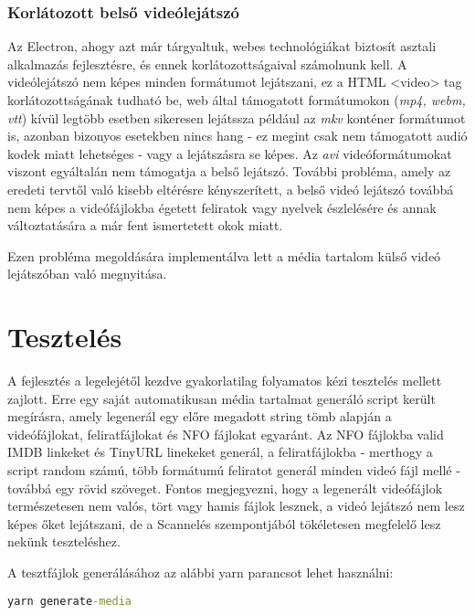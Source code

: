 \subsubsection{Korlátozott belső videólejátszó}
Az Electron, ahogy azt már tárgyaltuk, webes technológiákat biztosít asztali alkalmazás fejlesztésre, és ennek korlátozottságaival számolnunk kell. A videólejátszó nem képes minden formátumot lejátszani, ez a HTML <video> tag korlátozottságának tudható be, web által támogatott formátumokon ({\it mp4, webm, vtt}) kívül legtöbb esetben sikeresen lejátssza például az {\it mkv} konténer formátumot is, azonban bizonyos esetekben nincs hang - ez megint csak nem támogatott audió kodek miatt lehetséges - vagy a lejátszásra se képes. Az {\it avi} videóformátumokat viszont egyáltalán nem támogatja a belső lejátszó.
További probléma, amely az eredeti tervtől való kisebb eltérésre kényszerített, a belső videó lejátszó továbbá nem képes a videófájlokba égetett feliratok vagy nyelvek észlelésére és annak változtatására a már fent ismertetett okok miatt.

Ezen probléma megoldására implementálva lett a média tartalom külső videó lejátszóban való megnyitása.

\section{Tesztelés}
A fejlesztés a legelejétől kezdve gyakorlatilag folyamatos kézi tesztelés mellett zajlott. Erre egy saját automatikusan média tartalmat generáló script került megírásra, amely legenerál egy előre megadott string tömb alapján a videófájlokat, feliratfájlokat és NFO fájlokat egyaránt. Az NFO fájlokba valid IMDB linkeket és TinyURL linekeket generál, a feliratfájlokba - merthogy a script random számú, több formátumú feliratot generál minden videó fájl mellé - továbbá egy rövid szöveget. Fontos megjegyezni, hogy a legenerált videófájlok természetesen nem valós, tört vagy hamis fájlok lesznek, a videó lejátszó nem lesz képes őket lejátszani, de a Scannelés szempontjából tökéletesen megfelelő lesz nekünk teszteléshez.

A tesztfájlok generálásához az alábbi yarn parancsot lehet használni:
\begin{lstlisting}[language={cmd}, numbers={none}]
    yarn generate-media
\end{lstlisting}

